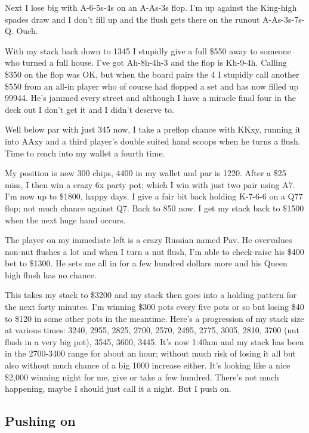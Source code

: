 Next I lose big with A-6-5s-4s on an A-As-3s flop. I'm up against the
King-high spades draw and I don't fill up and the flush gets there on
the runout A-As-3s-7s-Q. Ouch.

With my stack back down to 1345 I stupidly give a full \$550 away to
someone who turned a full house. I've got Ah-8h-4h-3 and the flop is
Kh-9-4h. Calling \$350 on the flop was OK, but when the board pairs
the 4 I stupidly call another \$550 from an all-in player who of
course had flopped a set and has now filled up 99944. He's jammed
every street and although I have a miracle final four in the deck out
I don't get it and I didn't deserve to.

Well below par with just 345 now, I take a preflop chance with KKxy,
running it into AAxy and a third player's double suited hand scoops
when he turns a flush. Time to reach into my wallet a fourth time.

My position is now 300 chips, 4400 in my wallet and par is 1220.
After a \$25 miss, I then win a crazy 6x party pot; which I win with
just two pair using A7. I'm now up to \$1800, happy days. I give
a fair bit back holding K-7-6-6 on a Q77 flop; not much chance against
Q7. Back to 850 now. I get my stack back to \$1500 when the next huge
hand occurs.

The player on my immediate left is a crazy Russian named Pav. He
overvalues non-nut flushes a lot and when I turn a nut flush, I'm able
to check-raise his \$400 bet to \$1300. He sets me all in for a few
hundred dollars more and his Queen high flush has no chance.

This takes my stack to \$3200 and my stack then goes into a holding
pattern for the next forty minutes. I'm winning \$300 pots every five
pots or so but losing \$40 to \$120 in some other pots in the
meantime. Here's a progression of my stack size at various times:
3240, 2955, 2825, 2700, 2570, 2495, 2775, 3005, 2810, 3700 (nut flush
in a very big pot), 3545, 3600, 3445. It's now 1:40am and my stack has
been in the 2700-3400 range for about an hour; without much risk of
losing it all but also without much chance of a big 1000 increase
either. It's looking like a nice \$2,000 winning night for me, give or
take a few hundred. There's not much happening, maybe I should just
call it a night. But I push on.

\subsection*{Pushing on}

